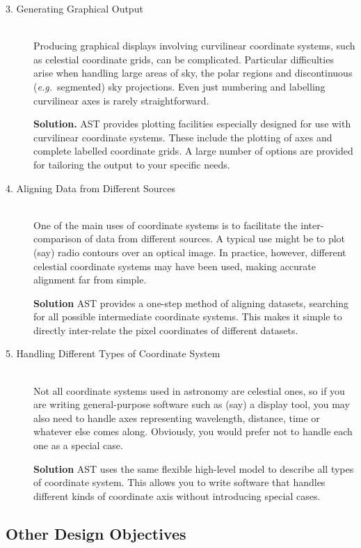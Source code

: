 \documentclass[twoside,11pt]{article}
\begin{document}
\begin{description}
\item[3. Generating Graphical Output]\mbox{}\\
Producing graphical displays involving curvilinear coordinate systems,
such as celestial coordinate grids, can be complicated. Particular
difficulties arise when handling large areas of sky, the polar regions
and discontinuous ({\em{e.g.}}\ segmented) sky projections.  Even just
numbering and labelling curvilinear axes is rarely straightforward.

{\bf{Solution.}} AST provides plotting facilities especially designed
for use with curvilinear coordinate systems. These include the
plotting of axes and complete labelled coordinate grids.  A large
number of options are provided for tailoring the output to your
specific needs.

\item[4. Aligning Data from Different Sources]\mbox{}\\
One of the main uses of coordinate systems is to facilitate the
inter-comparison of data from different sources. A typical use might
be to plot (say) radio contours over an optical image.  In practice,
however, different celestial coordinate systems may have been used,
making accurate alignment far from simple.

{\bf{Solution}} AST provides a one-step method of aligning datasets,
searching for all possible intermediate coordinate systems.  This
makes it simple to directly inter-relate the pixel coordinates of
different datasets.

\item[5. Handling Different Types of Coordinate System]\mbox{}\\
Not all coordinate systems used in astronomy are celestial ones, so if
you are writing general-purpose software such as (say) a display tool,
you may also need to handle axes representing wavelength, distance,
time or whatever else comes along. Obviously, you would prefer not to
handle each one as a special case.

{\bf{Solution}} AST uses the same flexible high-level model to
describe all types of coordinate system. This allows you to write
software that handles different kinds of coordinate axis without
introducing special cases.
\end{description}

\subsection{Other Design Objectives}
\end{document}
